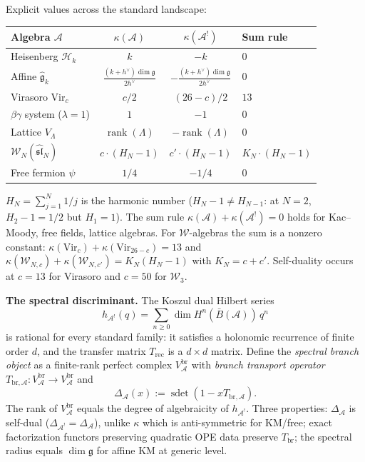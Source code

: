 \documentclass[11pt,reqno]{amsart}
\theoremstyle{definition}
\theoremstyle{remark}
\providecommand{\cA}{\mathcal{A}}
\providecommand{\cH}{\mathcal{H}}
\providecommand{\barB}{\bar{B}}
\providecommand{\fg}{\mathfrak{g}}
\numberwithin{equation}{section}
\begin{document}
Explicit values across the standard landscape:
\begin{center}
\renewcommand{\arraystretch}{1.2}
\begin{tabular}{lccl}
\textbf{Algebra $\cA$} & $\kappa(\cA)$ & $\kappa(\cA^!)$ & \textbf{Sum rule}\\
\hline
Heisenberg $\cH_k$ & $k$ & $-k$ & $0$\\[1pt]
Affine $\widehat{\fg}_k$ & $\tfrac{(k+h^\vee)\dim\fg}{2h^\vee}$ & $-\tfrac{(k+h^\vee)\dim\fg}{2h^\vee}$ & $0$\\[4pt]
Virasoro $\mathrm{Vir}_c$ & $c/2$ & $(26-c)/2$ & $13$\\[1pt]
$\beta\gamma$ system ($\lambda{=}1$) & $1$ & $-1$ & $0$\\[1pt]
Lattice $V_\Lambda$ & $\operatorname{rank}(\Lambda)$ & $-\operatorname{rank}(\Lambda)$ & $0$\\[1pt]
$\mathcal W_N(\widehat{\mathfrak{sl}}_N)$ & $c\cdot(H_N-1)$ & $c'\cdot(H_N-1)$ & $K_N\cdot(H_N-1)$\\[4pt]
Free fermion $\psi$ & $1/4$ & $-1/4$ & $0$
\end{tabular}
\end{center}
$H_N=\sum_{j=1}^N 1/j$ is the harmonic number
($H_N-1\neq H_{N-1}$: at $N=2$, $H_2-1=1/2$ but $H_1=1$). The sum rule
$\kappa(\cA)+\kappa(\cA^!)=0$ holds for Kac--Moody, free fields,
lattice algebras. For $\mathcal W$-algebras the sum is a nonzero
constant: $\kappa(\mathrm{Vir}_c)+\kappa(\mathrm{Vir}_{26-c})=13$ and
$\kappa(\mathcal W_{N,c})+\kappa(\mathcal W_{N,c'})=K_N(H_N-1)$ with
$K_N=c+c'$. Self-duality occurs at $c=13$ for Virasoro and $c=50$
for $\mathcal W_3$.

\medskip
\noindent\textbf{The spectral discriminant.}\enspace
The Koszul dual Hilbert series
\[
h_{\cA^!}(q)=\sum_{n\ge 0}\dim H^n(\barB(\cA))\,q^n
\]
is rational for every standard family: it satisfies a holonomic
recurrence of finite order $d$, and the transfer matrix
$T_{\mathrm{rec}}$ is a $d\times d$ matrix. Define the
\emph{spectral branch object} as a finite-rank perfect complex
$V^{\mathrm{br}}_\cA$ with \emph{branch transport operator}
$T_{\mathrm{br},\cA}\colon V^{\mathrm{br}}_\cA\to V^{\mathrm{br}}_\cA$
and
\begin{equation}\label{eq:pref-delta-def}
\Delta_\cA(x):=\operatorname{sdet}(1-xT_{\mathrm{br},\cA}).
\end{equation}
The rank of $V^{\mathrm{br}}_\cA$ equals the degree of algebraicity of
$h_{\cA^!}$. Three properties: $\Delta_\cA$ is self-dual
($\Delta_{\cA^!}=\Delta_\cA$), unlike $\kappa$ which is anti-symmetric
for KM/free; exact factorization functors preserving quadratic OPE
data preserve $T_{\mathrm{br}}$; the spectral radius equals
$\dim\mathfrak g$ for affine KM at generic level.
\end{document}
